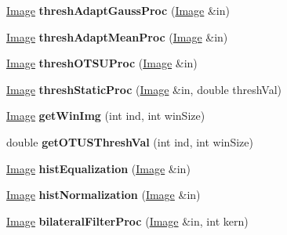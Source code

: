 \begin{DoxyCompactItemize}
\item 
\hyperlink{classImage}{Image} {\bfseries thresh\+Adapt\+Gauss\+Proc} (\hyperlink{classImage}{Image} \&in)\hypertarget{classMorphOps_a5ae1e857382a662fff54c632a7d7b5e5}{}\label{classMorphOps_a5ae1e857382a662fff54c632a7d7b5e5}

\item 
\hyperlink{classImage}{Image} {\bfseries thresh\+Adapt\+Mean\+Proc} (\hyperlink{classImage}{Image} \&in)\hypertarget{classMorphOps_aaa1e5a43536ac12ef135050de4e7fd66}{}\label{classMorphOps_aaa1e5a43536ac12ef135050de4e7fd66}

\item 
\hyperlink{classImage}{Image} {\bfseries thresh\+O\+T\+S\+U\+Proc} (\hyperlink{classImage}{Image} \&in)\hypertarget{classMorphOps_a5f898ce4f35742c9af1054b7da4722b8}{}\label{classMorphOps_a5f898ce4f35742c9af1054b7da4722b8}

\item 
\hyperlink{classImage}{Image} {\bfseries thresh\+Static\+Proc} (\hyperlink{classImage}{Image} \&in, double thresh\+Val)\hypertarget{classMorphOps_a7add19cc2ec7544307d224d96f7f1b92}{}\label{classMorphOps_a7add19cc2ec7544307d224d96f7f1b92}

\item 
\hyperlink{classImage}{Image} {\bfseries get\+Win\+Img} (int ind, int win\+Size)\hypertarget{classMorphOps_a08a10a68676b2f430b73ca7297a2756b}{}\label{classMorphOps_a08a10a68676b2f430b73ca7297a2756b}

\item 
double {\bfseries get\+O\+T\+U\+S\+Thresh\+Val} (int ind, int win\+Size)\hypertarget{classMorphOps_ac970742a2d1ee15059a8df3ebcd55ff1}{}\label{classMorphOps_ac970742a2d1ee15059a8df3ebcd55ff1}

\item 
\hyperlink{classImage}{Image} {\bfseries hist\+Equalization} (\hyperlink{classImage}{Image} \&in)\hypertarget{classMorphOps_a4f480cefe21011569ecaaa2d19c90e2f}{}\label{classMorphOps_a4f480cefe21011569ecaaa2d19c90e2f}

\item 
\hyperlink{classImage}{Image} {\bfseries hist\+Normalization} (\hyperlink{classImage}{Image} \&in)\hypertarget{classMorphOps_a17ee1e01c8b2e9fd7d5730a0a03a8380}{}\label{classMorphOps_a17ee1e01c8b2e9fd7d5730a0a03a8380}

\item 
\hyperlink{classImage}{Image} {\bfseries bilateral\+Filter\+Proc} (\hyperlink{classImage}{Image} \&in, int kern)\hypertarget{classMorphOps_aa12dced8212555a43e3494f4f521045c}{}\label{classMorphOps_aa12dced8212555a43e3494f4f521045c}


\end{DoxyCompactItemize}
